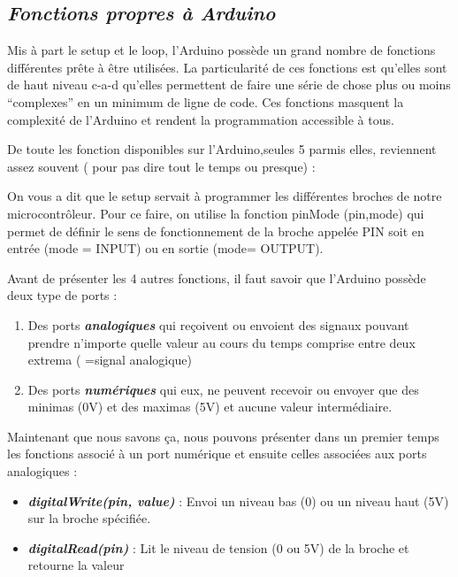 \documentclass[12pt,a4paper]{article}
\begin{document}
\subsection{\textit{\textbf{Fonctions propres à Arduino}}}

Mis à part le setup et le loop, l’Arduino possède un grand nombre de fonctions différentes prête à être utilisées. La particularité de ces fonctions est qu’elles sont de haut niveau c-a-d qu’elles permettent de faire une série de chose plus ou moins “complexes” en un minimum de ligne de code. Ces fonctions masquent la complexité de l’Arduino et rendent la programmation accessible à tous. 

\bigskip
De toute les fonction disponibles sur l’Arduino,seules 5 parmis elles, reviennent assez souvent ( pour pas dire tout le temps ou presque) :

\bigskip
On vous a dit que le setup servait à programmer les différentes broches de notre microcontrôleur. Pour ce faire, on utilise la fonction pinMode (pin,mode) qui permet de définir le sens de fonctionnement de la broche appelée PIN soit en entrée (mode = INPUT) ou en sortie (mode= OUTPUT).

\newpage
Avant de présenter les 4 autres fonctions, il faut savoir que l’Arduino possède deux type de ports : 

\bigskip
\begin{enumerate}
    \item  Des ports \textit{\textbf{analogiques}} qui reçoivent ou envoient des signaux pouvant prendre n’importe quelle valeur au cours du temps comprise entre deux extrema ( =signal analogique)
    \item Des ports  \textit{\textbf{numériques}} qui eux, ne peuvent recevoir ou envoyer que des minimas (0V) et des maximas (5V) et aucune valeur intermédiaire.
\end{enumerate}
   
\bigskip
Maintenant que nous savons ça, nous pouvons présenter dans un premier temps les fonctions associé à un port numérique et ensuite celles associées aux ports analogiques :

\bigskip
\begin{itemize}
   \item[] \textit{\textbf{digitalWrite(pin, value)}}  :  Envoi un niveau bas (0) ou un niveau haut (5V) sur la broche spécifiée.
   \bigskip
   \item[] \textit{\textbf{digitalRead(pin)}} : Lit le niveau de tension (0 ou 5V) de la broche et retourne la valeur
\end{itemize}
\
\end{document}
